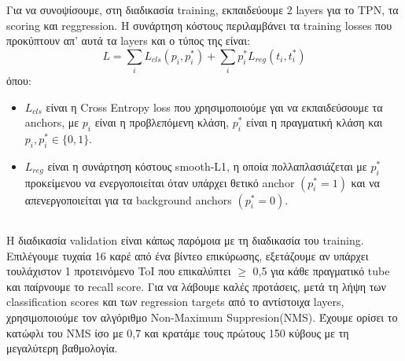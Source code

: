 Για να συνοψίσουμε, στη διαδικασία \en training\gr, εκπαιδεύουμε 2 \en layers \gr για το \en TPN, \gr τα \en scoring \gr και \en reggression\gr. Η συνάρτηση κόστους περιλαμβάνει τα
\en training losses \gr που προκύπτουν απ' αυτά τα \en layers \gr και ο τύπος της είναι: \en
\[ L  =  \sum_iL_{cls}(p_i, p_i^*) + \sum_ip_i^*L_{reg}(t_i,t_i^*) \]
\gr όπου:
\begin{itemize}
\item \en $L_{cls} $ \gr είναι η \en Cross Entropy loss \gr που χρησιμοποιούμε γαι να εκπαιδεύσουμε τα \en anchors\gr, με \en $p_i$  \gr είναι η προβλεπόμενη κλάση, \en $p_i^*$ \gr
  είναι η πραγματική κλάση και \en   $p_i, p_i^* \in \{0,1\}$. \gr
\item \en $L_{reg} $ \gr είναι η συνάρτηση κόστους \en smooth-L1\gr, η οποία πολλαπλασιάζεται με \en $p_i^*$  \gr προκείμενου να ενεργοποιείται όταν υπάρχει θετικό \en anchor  $(p_i^* = 1)$ \gr
  και να απενεργοποιείται για τα \en background anchors $(p_i^* = 0)$.
\end{itemize}
\gr
\subsection{}

Η διαδικασία \en validation \gr είναι κάπως παρόμοια με τη διαδικασία του \en training\gr.
Επιλέγουμε τυχαία 16 καρέ από ένα βίντεο επικύρωσης, εξετάζουμε αν υπάρχει τουλάχιστον 1 προτεινόμενο \en ToI \gr
που επικαλύπτει $\ge$ 0,5 για κάθε πραγματικό \en tube  \gr και παίρνουμε το \en recall score\gr.
Για να λάβουμε καλές προτάσεις, μετά τη λήψη των \en classification scores \gr και των \en regression targets \gr από το
αντίστοιχα \en layers\gr, χρησιμοποιούμε τον αλγόριθμο \en Non-Maximum Suppresion(NMS)\gr.
Έχουμε ορίσει το κατώφλι του \en NMS \gr ίσο με 0,7 και κρατάμε τους πρώτους 150 κύβους με τη μεγαλύτερη βαθμολογία.
